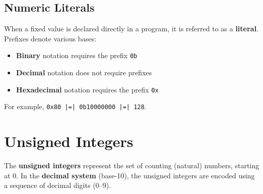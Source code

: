 \documentclass{report}
\begin{document}
\subsection{Numeric Literals}
When a fixed value is declared directly in a program, it is referred to
as a \textbf{literal}. Prefixes denote various bases:
\begin{itemize}
    \item \textbf{Binary} notation requires the prefix \texttt{0b}
    \item \textbf{Decimal} notation does not require prefixes
    \item \textbf{Hexadecimal} notation requires the prefix \texttt{0x}
\end{itemize}
For example, \texttt{0x80 |=| 0b10000000 |=| 128}. %
\section{Unsigned Integers}
The \textbf{unsigned integers} represent the set of counting (natural)
numbers, starting at 0. In the \textbf{decimal system} (base-10), the
unsigned integers are encoded using a sequence of decimal digits
(0--9).
\end{document}
